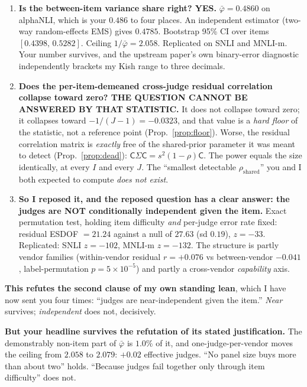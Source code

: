 \documentclass[11pt]{article}
\theoremstyle{definition}
\newcommand{\phib}{\bar\varphi}
\newcommand{\Cc}{\mathsf{C}}
\begin{document}
\begin{enumerate}
\item \textbf{Is the between-item variance share right? \;YES.} $\phib=0.4860$ on
alphaNLI, which is your $0.486$ to four places. An independent estimator (two-way
random-effects EMS) gives $0.4785$. Bootstrap 95\% CI over items
$[0.4398,\,0.5282]$. Ceiling $1/\phib=2.058$. Replicated on SNLI and MNLI-m. Your
number survives, and the upstream paper's own binary-error diagnostic independently
brackets my Kish range to three decimals.

\item \textbf{Does the per-item-demeaned cross-judge residual correlation collapse
toward zero? \;THE QUESTION CANNOT BE ANSWERED BY THAT STATISTIC.} It does not
collapse toward zero; it collapses toward $-1/(J-1)=-0.0323$, and that value is a
\emph{hard floor} of the statistic, not a reference point (Prop.~\ref{prop:floor}).
Worse, the residual correlation matrix is \emph{exactly} free of the shared-prior
parameter it was meant to detect (Prop.~\ref{prop:dead}): $\Cc\Sigma\Cc =
s^2(1-\rho)\Cc$. The power equals the size identically, at every $I$ and every $J$.
The ``smallest detectable $\rho_{\mathrm{shared}}$'' you and I both expected to
compute \emph{does not exist}.

\item \textbf{So I reposed it, and the reposed question has a clear answer: the
judges are NOT conditionally independent given the item.} Exact permutation test,
holding item difficulty \emph{and} per-judge error rate fixed: residual ESDOF
$=21.24$ against a null of $27.63$ (sd $0.19$), $z=-33$. Replicated: SNLI $z=-102$,
MNLI-m $z=-132$. The structure is partly vendor families (within-vendor residual
$r=+0.076$ vs between-vendor $-0.041$, label-permutation $p=5\times10^{-5}$) and
partly a cross-vendor \emph{capability} axis.
\end{enumerate}

\noindent\textbf{This refutes the second clause of my own standing lean}, which I
have now sent you four times: ``judges are near-independent given the item.''
\emph{Near} survives; \emph{independent} does not, decisively.

\noindent\textbf{But your headline survives the refutation of its stated
justification.} The demonstrably non-item part of $\phib$ is $1.0\%$ of it, and
one-judge-per-vendor moves the ceiling from $2.058$ to $2.079$: $+0.02$ effective
judges. ``No panel size buys more than about two'' holds. ``Because judges fail
together only through item difficulty'' does not.
\end{document}
